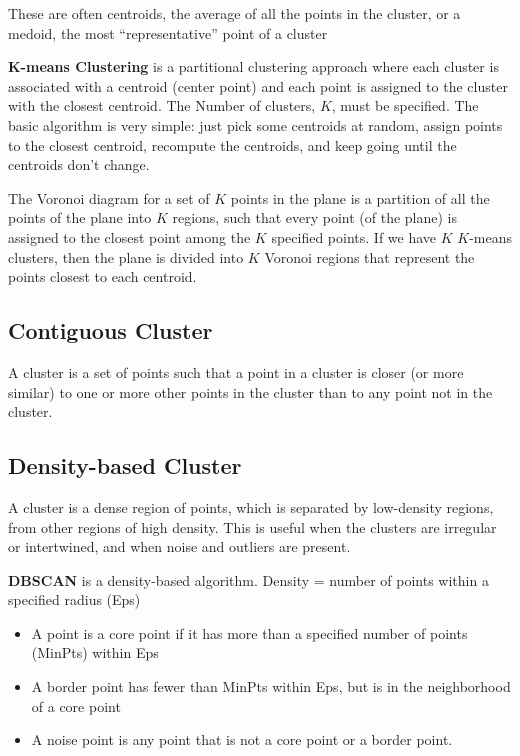 \documentclass[12pt]{amsart}
\begin{document}
These are often centroids, the average of all
the points in the cluster, or a medoid, the most ``representative''
point of a cluster 

\textbf{K-means Clustering} is a partitional clustering approach where each cluster is associated with a centroid (center point) and each point is assigned to the cluster with the closest
centroid.
The Number of clusters, $K$, must be specified. The basic algorithm is very simple: just pick some centroids at random, assign points to the closest centroid, recompute the centroids, and keep going until the centroids don't change.

The Voronoi diagram for a set of $K$ points in the plane is a partition of all the points of the plane into $K$ regions, such that every point (of the plane) is assigned to the closest point among the $K$ specified points. If we have $K$ $K$-means clusters, then the plane is divided into $K$ Voronoi regions that represent the points closest to each centroid.

\subsection{Contiguous Cluster}
A cluster is a set of points such that a point in a cluster is
closer (or more similar) to one or more other points in the
cluster than to any point not in the cluster.

\subsection{Density-based Cluster}
A cluster is a dense region of points, which is separated by
low-density regions, from other regions of high density. This is useful when the clusters are irregular or intertwined, and when
noise and outliers are present. 

\textbf{DBSCAN} is a density-based algorithm.
Density = number of points within a specified radius (Eps)

\begin{itemize}
  \item A point is a core point if it has more than a specified number
of points (MinPts) within Eps

\item A border point has fewer than MinPts within Eps, but is in
the neighborhood of a core point

\item A noise point is any point that is not a core point or a border
point. 
  
  
\end{itemize}
\end{document}
